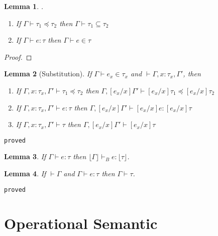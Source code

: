 \documentclass[10pt,a4paper]{article}
\newtheorem{lemma}{Lemma}
\newcommand\showproof[1]{\texttt{proved}}
\newcommand\sub[2]{\ensuremath{\left[ #2 / #1 \right]}}
\newcommand\erase[1]{\ensuremath{\lfloor #1 \rfloor}}
\newcommand\hastype[3]{\ensuremath{#1 \vdash #2 : #3}}
\newcommand\hastypebase[3]{\ensuremath{#1 \vdash_B #2 : #3}}
\newcommand\shastype[3]{\ensuremath{#1 \vdash #2 \in #3}}
\newcommand\iswellformed[2]{\ensuremath{#1 \vdash #2}}
\newcommand\issubtype[3]{\ensuremath{#1 \vdash #2 \preceq #3}}
\newcommand\sissubtype[3]{\ensuremath{#1 \vdash #2 \subseteq #3}}
\begin{document}
\begin{lemma}.
\begin{enumerate}
\item If \issubtype{\Gamma}{\tau_1}{\tau_2} then \sissubtype{\Gamma}{\tau_1}{\tau_2} 
\item If \hastype{\Gamma}{e}{\tau} then \shastype{\Gamma}{e}{\tau} 
\end{enumerate}
\end{lemma}
{%
	\begin{proof}
	
	\end{proof}
}


\begin{lemma}[Substitution]\label{lemma:substitution}
If \shastype{\Gamma}{e_x}{\tau_x} and \iswellformed{}{\Gamma, x\colon\tau_x ,\Gamma'}, then 
\begin{enumerate}
\item If 
	\issubtype{\Gamma, x\colon\tau_x, \Gamma'}{\tau_1}{\tau_2}
	then
	\issubtype{\Gamma, \sub{x}{e_x}\Gamma'}{\sub{x}{e_x}\tau_1}{\sub{x}{e_x}\tau_2}
\item If 
	\hastype{\Gamma, x\colon\tau_x, \Gamma'}{e}{\tau}
	then
	\hastype{\Gamma, \sub{x}{e_x}\Gamma'}{\sub{x}{e_x}e}{\sub{x}{e_x}\tau}
\item If 
	\iswellformed{\Gamma, x\colon\tau_x, \Gamma'}{\tau}
	then
	\iswellformed{\Gamma, \sub{x}{e_x}\Gamma'}{\sub{x}{e_x}\tau}
\end{enumerate}
\end{lemma}
\showproof{
	\begin{proof}
	
	\end{proof}
}

\begin{lemma}\label{lemma:erase} %
If \hastype{\Gamma}{e}{\tau} 
then \hastypebase{\erase{\Gamma}}{e}{\erase{\tau}}.
\end{lemma}


\begin{lemma}\label{lemma:wellformed}
If \iswellformed{}{\Gamma} and \hastype{\Gamma}{e}{\tau} then \iswellformed{\Gamma}{\tau}.
\end{lemma}
\showproof{
	\begin{proof}
	
	\end{proof}
}

\section*{Operational Semantic}
\end{document}

